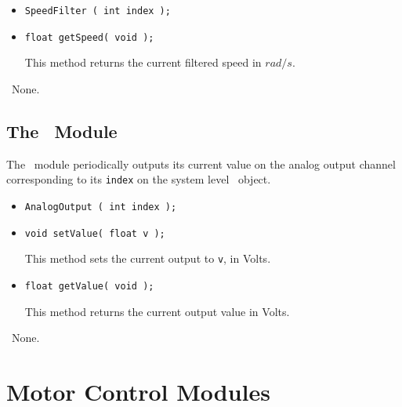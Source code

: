 \constructors

\begin{itemize}
\item{\tt SpeedFilter ( int index ); }
\end{itemize}

\localinterface

\begin{itemize}
\item{\tt float getSpeed( void );}\par
This method returns the current filtered speed in $rad/s$.
\end{itemize}

\configsymbols\ None.

\subsection{The \AnalogOutput\ Module}

\begin{moduleheader}
\classname{\AnalogOutput} \mline
\modulebase{\Module} \mline
{} \mline
{}
\end{moduleheader}

The \AnalogOutput\ module periodically outputs its current value on the
analog output channel corresponding to its { \tt index} on the system level
\Hardware\ object. \\

\constructors

\begin{itemize}
\item{\tt AnalogOutput ( int index ); }
\end{itemize}

\localinterface

\begin{itemize}
\item{\tt void setValue( float v );}\par
This method sets the current output to {\tt v}, in Volts.
\item{\tt float getValue( void );}\par
This method returns the current output value in Volts.
\end{itemize}

\configsymbols\ None.


\section{Motor Control Modules}

